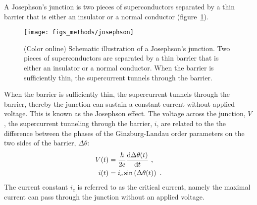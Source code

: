 A Josephson's junction is two pieces of superconductors separated by a thin barrier that is either an insulator or a normal conductor (figure~\ref{fig:josephson}). %
\begin{figure}[ht]%
	\centering%
    \texttt{[image: figs\_methods/josephson]}%
    \caption[Josephson's junction]{\label{fig:josephson}(Color online) Schematic illustration of a Josephson's junction. Two pieces of superconductors are separated by a thin barrier that is either an insulator or a normal conductor. When the barrier is sufficiently thin, the supercurrent tunnels through the barrier.}%
\end{figure}%
%
When the barrier is sufficiently thin, the supercurrent tunnels through the barrier, thereby the junction can sustain a constant current without applied voltage. This is known as the Josephson effect. The voltage across the junction, $V$, the supercurrent tunneling through the barrier, $i$, are related to the the difference between the phases of the Ginzburg-Landau order parameters on the two sides of the barrier, $\Delta\theta$:~\cite{Josephson1962, Josephson1974}
\begin{align}
    V(t) &= \frac{\hbar}{2e}\frac{\mathop{}\!\mathrm{d} \Delta\theta(t)}{\mathop{}\!\mathrm{d} t}~,\\
    i(t) &= i_c\sin\left(\Delta\theta(t)\right)~.\label{eq:Josephson_I}
\end{align}%
The current constant $i_c$ is referred to as the critical current, namely the maximal current can pass through the junction without an applied voltage.


